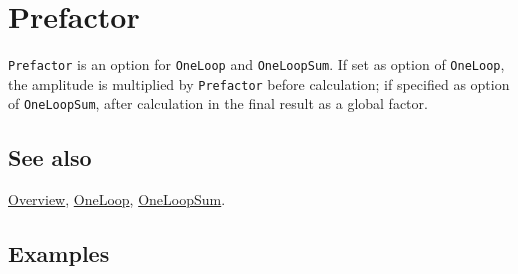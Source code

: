\documentclass[../FeynCalcManual.tex]{subfiles}
\begin{document}
\hypertarget{prefactor}{
\section{Prefactor}\label{prefactor}}

\texttt{Prefactor} is an option for \texttt{OneLoop} and
\texttt{OneLoopSum}. If set as option of \texttt{OneLoop}, the amplitude
is multiplied by \texttt{Prefactor} before calculation; if specified as
option of \texttt{OneLoopSum}, after calculation in the final result as
a global factor.

\subsection{See also}

\hyperlink{toc}{Overview}, \hyperlink{oneloop}{OneLoop},
\hyperlink{oneloopsum}{OneLoopSum}.

\subsection{Examples}
\end{document}
